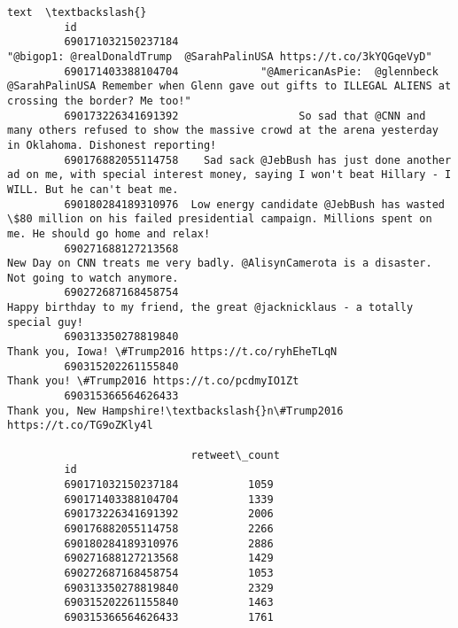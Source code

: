 \documentclass[11pt]{article}
\begin{document}
\begin{Verbatim}[commandchars=\\\{\}]
                                                                                                                                                                     text  \textbackslash{}
         id                                                                                                                                                                 
         690171032150237184                                                                           "@bigop1: @realDonaldTrump  @SarahPalinUSA https://t.co/3kYQGqeVyD"   
         690171403388104704             "@AmericanAsPie:  @glennbeck @SarahPalinUSA Remember when Glenn gave out gifts to ILLEGAL ALIENS at crossing the border? Me too!"   
         690173226341691392                   So sad that @CNN and many others refused to show the massive crowd at the arena yesterday in Oklahoma. Dishonest reporting!   
         690176882055114758    Sad sack @JebBush has just done another ad on me, with special interest money, saying I won't beat Hillary - I WILL. But he can't beat me.   
         690180284189310976  Low energy candidate @JebBush has wasted \$80 million on his failed presidential campaign. Millions spent on me. He should go home and relax!   
         690271688127213568                                               New Day on CNN treats me very badly. @AlisynCamerota is a disaster. Not going to watch anymore.   
         690272687168458754                                                                 Happy birthday to my friend, the great @jacknicklaus - a totally special guy!   
         690313350278819840                                                                                           Thank you, Iowa! \#Trump2016 https://t.co/ryhEheTLqN   
         690315202261155840                                                                                                 Thank you! \#Trump2016 https://t.co/pcdmyIO1Zt   
         690315366564626433                                                                                 Thank you, New Hampshire!\textbackslash{}n\#Trump2016 https://t.co/TG9oZKly4l   
         
                             retweet\_count  
         id                                 
         690171032150237184           1059  
         690171403388104704           1339  
         690173226341691392           2006  
         690176882055114758           2266  
         690180284189310976           2886  
         690271688127213568           1429  
         690272687168458754           1053  
         690313350278819840           2329  
         690315202261155840           1463  
         690315366564626433           1761  
\end{Verbatim}
            
\end{document}
